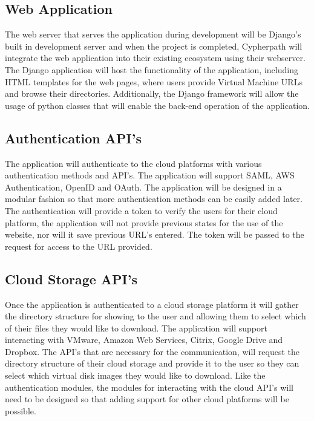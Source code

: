 \documentclass{article}
\begin{document}
        \subsection{Web Application}
        The web server that serves the application during development will be Django's built in development server and when the project is completed, Cypherpath will integrate
        the web application into their existing ecosystem using their webserver. The Django application will host the functionality of the application, including HTML templates for the 
        web pages, where users provide Virtual Machine URLs and browse their directories. Additionally, the Django framework will allow the usage of python classes that will enable the 
        back-end operation of the application.

        
        \subsection{Authentication API's}
        The application will authenticate to the cloud platforms with various authentication methods and API's. The application will support
        SAML, AWS Authentication, OpenID and OAuth. The application will be designed in a modular fashion so that more authentication methods can be easily added later.
        The authentication will provide a token to verify the users for their cloud platform, the application will not provide previous states for the use of the 
        website, nor will it save previous URL's entered. The token will be passed to the request for access to the URL provided.


        \subsection{Cloud Storage API's}
        Once the application is authenticated to a cloud storage platform it will gather the directory structure for showing to the user and allowing them to select
        which of their files they would like to download. The application will support interacting with VMware, Amazon Web Services, Citrix, Google Drive and Dropbox. The API's
        that are necessary for the communication, will request the directory structure of their cloud storage and provide it to the user so they can select which virtual disk
        images they would like to download. Like the authentication modules, the modules
        for interacting with the cloud API's will need to be designed so that adding support for other cloud platforms will be possible.
\end{document}
